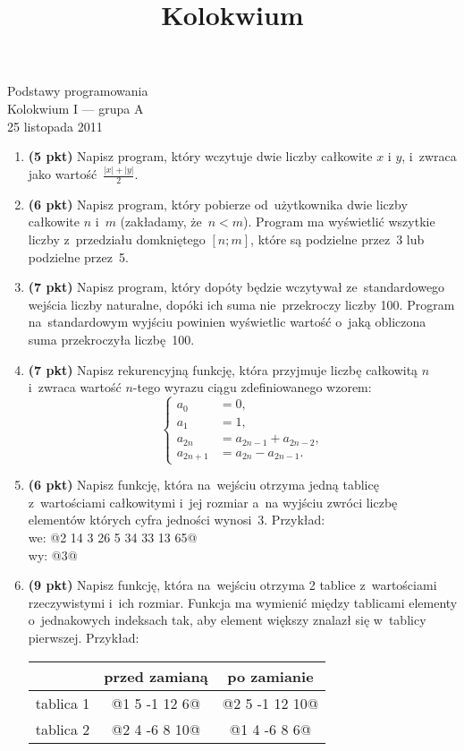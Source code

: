 \documentclass[12pt]{article}
\title{Kolokwium}
\begin{document}
\DefineShortVerb{\@}
\begin{center}
\Large{Podstawy programowania}\\
\large{Kolokwium I --- grupa A}\\
\small{25 listopada 2011}
\end{center}

\begin{enumerate}
\item \textbf{(5 pkt)} Napisz program, który wczytuje dwie liczby całkowite $x$ i $y$, i~zwraca jako wartość~$\frac{|x|+|y|}{2}$.
\item \textbf{(6 pkt)} Napisz program, który pobierze od~użytkownika dwie liczby całkowite $n$ i~$m$
	(zakładamy, że~$n < m$). Program ma wyświetlić wszytkie liczby z~przedziału domkniętego $[n; m]$,
	które są podzielne przez~3 lub podzielne przez~5.
\item \textbf{(7 pkt)} Napisz program, który dopóty będzie wczytywał ze~standardowego wejścia liczby naturalne,
	dopóki ich suma nie~przekroczy liczby 100. Program na~standardowym wyjściu powinien
	wyświetlic wartość o~jaką obliczona suma przekroczyła liczbę~100.

\item  \textbf{(7 pkt)}
Napisz rekurencyjną funkcję, która przyjmuje liczbę całkowitą $n$ i~zwraca wartość $n$-tego wyrazu ciągu zdefiniowanego wzorem:
$$
\begin{cases}
	a_0 & = 0,\\
	a_1 & = 1,\\
	a_{2n} & = a_{2n-1} + a_{2n-2},\\
	a_{2n+1} & = a_{2n} - a_{2n-1}.
\end{cases}
$$

\item \textbf{(6 pkt)}
Napisz funkcję, która na~wejściu otrzyma jedną tablicę z~wartościami całkowitymi
i~jej rozmiar a~na wyjściu zwróci liczbę elementów których cyfra jedności wynosi~3.
Przykład:\\
we: @2 14 3 26 5 34 33 13 65@\\
wy: @3@

\item \textbf{(9 pkt)}
Napisz funkcję, która na~wejściu otrzyma 2 tablice z~wartościami rzeczywistymi i~ich rozmiar.
Funkcja ma wymienić między tablicami elementy o~jednakowych indeksach tak, aby element większy znalazł się w~tablicy pierwszej.
Przykład:\\
\vspace{-0.5cm}
\begin{center}
\begin{tabular}{r | c | c}
		& przed zamianą 	& po zamianie\\ \hline
tablica 1	& @1 5 -1 12  6@ 	& @2 5 -1 12 10@\\
tablica 2	& @2 4 -6  8 10@ 	& @1 4 -6  8  6@
\end{tabular}
\end{center}
\end{enumerate}
\end{document}
